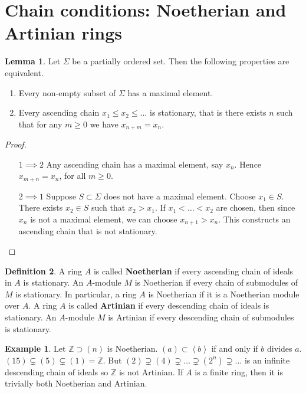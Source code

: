 \documentclass{article}
\newcommand{\Z}{\mathbb{Z}}
\newcommand{\rb}[1]{\left( #1 \right)}
\newcommand{\ab}[1]{\left\langle #1 \right\rangle}
\theoremstyle{definition}\newtheorem{definition}{Definition}[section]
\theoremstyle{definition}\newtheorem{remark}[definition]{Remark}
\theoremstyle{definition}\newtheorem*{example}{Example}
\theoremstyle{definition}\newtheorem*{note}{Note}
\newtheorem{lemma}[definition]{Lemma}
\begin{document}
\section{Chain conditions: Noetherian and Artinian rings}

\begin{lemma}
Let $ \Sigma $ be a partially ordered set. Then the following properties are equivalent.
\begin{enumerate}
\item Every non-empty subset of $ \Sigma $ has a maximal element.
\item Every ascending chain $ x_1 \le x_2 \le \dots $ is stationary, that is there exists $ n $ such that for any $ m \ge 0 $ we have $ x_{n + m} = x_n $.
\end{enumerate}
\end{lemma}

\begin{proof}
\hfill
\begin{enumerate}[leftmargin=2cm]
\item[$ 1 \implies 2 $] Any ascending chain has a maximal element, say $ x_n $. Hence $ x_{m + n} = x_n $, for all $ m \ge 0 $.
\item[$ 2 \implies 1 $] Suppose $ S \subset \Sigma $ does not have a maximal element. Choose $ x_1 \in S $. There exists $ x_2 \in S $ such that $ x_2 > x_1 $. If $ x_1 < \dots < x_2 $ are chosen, then since $ x_n $ is not a maximal element, we can choose $ x_{n + 1} > x_n $. This constructs an ascending chain that is not stationary.
\end{enumerate}
\end{proof}

\begin{definition}
A ring $ A $ is called \textbf{Noetherian} if every ascending chain of ideals in $ A $ is stationary. An $ A $-module $ M $ is Noetherian if every chain of submodules of $ M $ is stationary. In particular, a ring $ A $ is Noetherian if it is a Noetherian module over $ A $. A ring $ A $ is called \textbf{Artinian} if every descending chain of ideals is stationary. An $ A $-module $ M $ is Artinian if every descending chain of submodules is stationary.
\end{definition}

\begin{example}
Let $ \Z \supset \rb{n} $ is Noetherian. $ \rb{a} \subset \ab{b} $ if and only if $ b $ divides $ a $. $ \rb{15} \subsetneq \rb{5} \subsetneq \rb{1} = \Z $. But $ \rb{2} \supsetneq \rb{4} \supsetneq \dots \supsetneq \rb{2^n} \supsetneq \dots $ is an infinite descending chain of ideals so $ \Z $ is not Artinian. If $ A $ is a finite ring, then it is trivially both Noetherian and Artinian.
\end{example}
\end{document}
